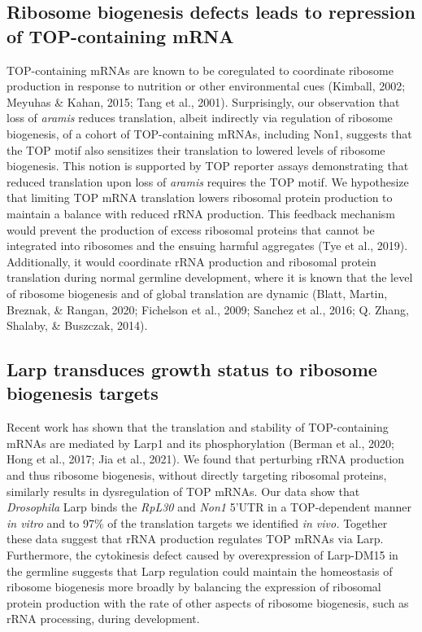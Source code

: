 \documentclass[12pt,oneside]{reedthesis}
\begin{document}
\hypertarget{ribosome-biogenesis-defects-leads-to-repression-of-top-containing-mrna}{%
\subsection{Ribosome biogenesis defects leads to repression of TOP-containing mRNA}\label{ribosome-biogenesis-defects-leads-to-repression-of-top-containing-mrna}}

TOP-containing mRNAs are known to be coregulated to coordinate ribosome production in response to nutrition or other environmental cues (Kimball, 2002; Meyuhas \& Kahan, 2015; Tang et al., 2001). Surprisingly, our observation that loss of \emph{aramis} reduces translation, albeit indirectly via regulation of ribosome biogenesis, of a cohort of TOP-containing mRNAs, including Non1, suggests that the TOP motif also sensitizes their translation to lowered levels of ribosome biogenesis. This notion is supported by TOP reporter assays demonstrating that reduced translation upon loss of \emph{aramis} requires the TOP motif. We hypothesize that limiting TOP mRNA translation lowers ribosomal protein production to maintain a balance with reduced rRNA production. This feedback mechanism would prevent the production of excess ribosomal proteins that cannot be integrated into ribosomes and the ensuing harmful aggregates (Tye et al., 2019). Additionally, it would coordinate rRNA production and ribosomal protein translation during normal germline development, where it is known that the level of ribosome biogenesis and of global translation are dynamic (Blatt, Martin, Breznak, \& Rangan, 2020; Fichelson et al., 2009; Sanchez et al., 2016; Q. Zhang, Shalaby, \& Buszczak, 2014).

\hypertarget{larp-transduces-growth-status-to-ribosome-biogenesis-targets}{%
\subsection{Larp transduces growth status to ribosome biogenesis targets}\label{larp-transduces-growth-status-to-ribosome-biogenesis-targets}}

Recent work has shown that the translation and stability of TOP-containing mRNAs are mediated by Larp1 and its phosphorylation (Berman et al., 2020; Hong et al., 2017; Jia et al., 2021). We found that perturbing rRNA production and thus ribosome biogenesis, without directly targeting ribosomal proteins, similarly results in dysregulation of TOP mRNAs. Our data show that \emph{Drosophila} Larp binds the \emph{RpL30} and \emph{Non1} 5'UTR in a TOP-dependent manner \emph{in vitro} and to 97\% of the translation targets we identified \emph{in vivo.} Together these data suggest that rRNA production regulates TOP mRNAs via Larp. Furthermore, the cytokinesis defect caused by overexpression of Larp-DM15 in the germline suggests that Larp regulation could maintain the homeostasis of ribosome biogenesis more broadly by balancing the expression of ribosomal protein production with the rate of other aspects of ribosome biogenesis, such as rRNA processing, during development.
\end{document}
